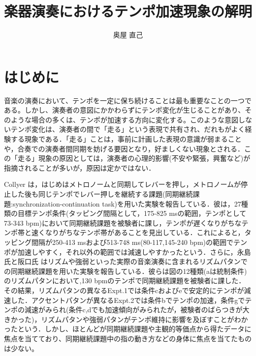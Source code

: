 \documentclass[twocolumn,10pt]{jarticle}
\title{楽器演奏におけるテンポ加速現象の解明}
\author{奥屋 直己}
\begin{document}
\maketitle

\section{はじめに}
音楽の演奏において、テンポを一定に保ち続けることは最も重要なことの一つである。しかし、演奏者の意図にかかわらずにテンポ変化が生じることがあり、そのような場合の多くは、テンポが加速する方向に変化する。このような意図しないテンポ変化は、演奏者の間で「走る」という表現で共有され、だれもがよく経験する現象である．「走る」ことは，事前に計画した表現の意識が弱まることや，合奏での演奏者間同期を妨げる要因となり，好ましくない現象とされる．この「走る」現象の原因としては，演奏者の心理的影響(不安や緊張，興奮など)が指摘されることが多いが，原因は定かではない．

Collyer \cite{Collyer}は，はじめはメトロノームと同期してレバーを押し，メトロノームが停止した後も同じテンポでレバー押しを継続する課題(同期継続課題:synchronization-continuation task)を用いた実験を報告している．彼は，27種類の目標テンポ条件(タッピング間隔として，175-825 msの範囲，テンポとして73-343 bpm)において同期継続課題を被験者に課し，テンポが遅くなりがちなテンポ帯と速くなりがちなテンポ帯があることを見出している．これによると，タッピング間隔が250-413 msおよび513-748 ms(80-117,145-240 bpm)の範囲でテンポが加速しやすく，それ以外の範囲では減速しやすかったという．さらに，永島氏と阪口氏 \cite{Nagasima}はリズムや強弱といった実際の音楽演奏に含まれるリズムパタンでの同期継続課題を用いた実験を報告している．彼らは図\label{Nagasima}の12種類(aは統制条件)のリズムパタンにおいて,130 bpmのテンポで同期継続課題を被験者に課した．その結果，リズムパタンの異なるExpt.1では条件cおよびeで安定的にテンポが減速した．アクセントパタンが異なるExpt.2では条件bでテンポの加速，条件gでテンポの減速がみられ(条件c,dでも加速傾向がみられたが，被験者のばらつきが大きかった)，リズムパタンや強弱パタンがテンポ維持に影響を及ぼすことがわかったという．しかし、ほとんどが同期継続課題や主観的等価点から得たデータに焦点を当てており、同期継続課題中の指の動き方などの身体に焦点を当てたものは少ない。
\end{document}
